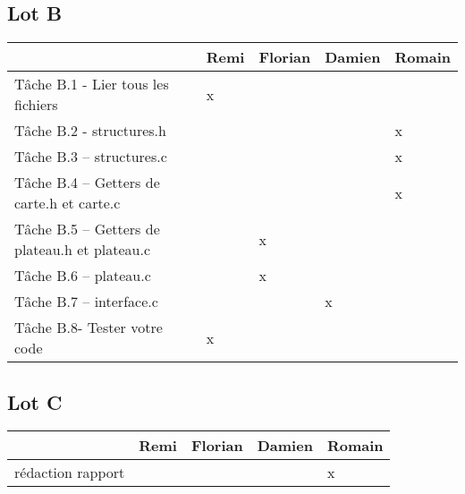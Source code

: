 \documentclass[12pt]{article}
\begin{document}
\subsection{Lot B}
\begin{tabular}{|p{8cm}|p{1.3cm}|p{1.3cm}|p{1.4cm}|p{1.6cm}|}
\hline
& Remi  & Florian  &  Damien &  Romain \\
\hline
Tâche B.1 - Lier tous les fichiers & x& & & \\
\hline
Tâche B.2 - structures.h&  &  & &x  \\
\hline
Tâche B.3 – structures.c& & & &x \\
\hline
Tâche B.4 – Getters de carte.h et carte.c & & &  & x \\
\hline
Tâche B.5 – Getters de plateau.h et plateau.c & &x &  &  \\
\hline
Tâche B.6 – plateau.c & &x &  &  \\
\hline
Tâche B.7 – interface.c & & & x &  \\
\hline
Tâche B.8-  Tester votre code&x&&  &\\
\hline
\end{tabular}

\subsection{Lot C}

\begin{tabular}{|p{8cm}|p{1.3cm}|p{1.3cm}|p{1.4cm}|p{1.6cm}|}
\hline
& Remi  & Florian  &  Damien &  Romain \\
\hline
rédaction rapport  & & & &x \\
\hline
\end{tabular}
\end{document}

